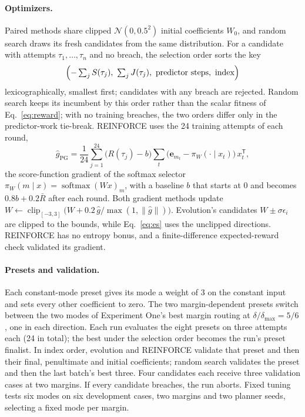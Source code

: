 \documentclass[sigconf,nonacm]{acmart}
\begin{document}
\paragraph{Optimizers.} Paired methods share clipped $\mathcal N(0,0.5^2)$
initial coefficients $W_0$, and random search draws its fresh candidates
from the same distribution. For a candidate with attempts
$\tau_1,\dots,\tau_n$ and no breach, the selection order sorts the key
\begin{equation*}
\Bigl(-\textstyle\sum_j S(\tau_j),\ \sum_j J(\tau_j),\ \text{predictor steps},\ \text{index}\Bigr)
\end{equation*}
lexicographically, smallest first; candidates with any breach are rejected.
Random search keeps its incumbent by this order rather than the scalar
fitness of Eq.~\ref{eq:reward}; with no training breaches, the two orders
differ only in the predictor-work tie-break. REINFORCE uses the 24 training
attempts of each round,
\begin{equation*}
\hat g_{\mathrm{PG}}=\frac{1}{24}\sum_{j=1}^{24}\bigl(R(\tau_j)-b\bigr)
\sum_t\bigl(\mathbf e_{m_t}-\pi_W(\cdot\mid x_t)\bigr)\,x_t^{\mathsf T},
\end{equation*}
the score-function gradient of the softmax selector
$\pi_W(m\mid x)=\operatorname{softmax}(Wx)_m$, with a baseline $b$ that
starts at 0 and becomes $0.8b+0.2\bar R$ after each round. Both gradient
methods update $W\gets\operatorname{clip}_{[-3,3]}\bigl(W+0.2\,\hat
g/\max(1,\lVert\hat g\rVert)\bigr)$. Evolution's candidates $W\pm\sigma\epsilon_i$
are clipped to the bounds, while Eq.~\ref{eq:es} uses the unclipped
directions. REINFORCE has no entropy bonus, and a finite-difference
expected-reward check validated its gradient.

\paragraph{Presets and validation.} Each constant-mode preset gives its
mode a weight of 3 on the constant input and sets every other coefficient to
zero. The two margin-dependent presets switch between the two modes of
Experiment One's best margin routing at $\delta/\delta_{\max}=5/6$, one in
each direction. Each run evaluates the eight presets
on three attempts each (24 in total); the best under the selection order
becomes the run's preset finalist. In index order, evolution and REINFORCE
validate that preset and then their final, penultimate and initial
coefficients; random search validates the preset and then the last batch's
best three. Four candidates each receive three validation cases at two
margins. If every candidate breaches, the run aborts. Fixed tuning tests
six modes on six development cases, two margins and two planner seeds,
selecting a fixed mode per margin.
\end{document}
